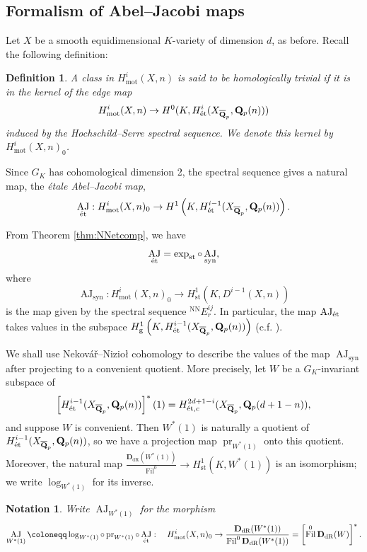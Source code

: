 \documentclass[cjm]{ipart}
\theoremstyle{plain}
\newtheorem{definition}[theorem]{Definition}
\newtheorem{notation}[theorem]{Notation}
\theoremstyle{remark}
\DeclareMathOperator{\AJ}{AJ}
\DeclareMathOperator{\Fil}{Fil}
\DeclareMathOperator{\mot}{mot}
\DeclareMathOperator{\pr}{pr}
\DeclareMathOperator{\st}{st}
\DeclareMathOperator{\syn}{syn}
\newcommand{\DdR}{\mathbf{D}_{\mathrm{dR}}}
\newcommand{\Nek}{Nekov\'a\v{r}\xspace}
\newcommand{\Niz}{Nizio\l\xspace}
\newcommand{\QQbar}{\overline{\QQ}}
\newcommand{\QQ}{\mathbf{Q}}
\newcommand{\Qp}{\QQ_p}
\newcommand{\et}{\text{\textup{\'et}}}
\numberwithin{equation}{subsection}
\begin{document}

 \subsection{Formalism of Abel--Jacobi maps}

  Let $X$ be a smooth equidimensional $K$-variety of dimension $d$, as before. Recall the following definition:

  \begin{definition}
   A class in $H^i_{\mot}(X, n)$ is said to be \emph{homologically trivial} if it is in the kernel of the edge map
   \[ H^i_{\mot}(X, n) \to H^0(K, H^i_{\et}(X_{\QQbar_p}, \Qp(n))) \]
   induced by the Hochschild--Serre spectral sequence. We denote this kernel by $H^i_{\mot}(X, n)_0$.
  \end{definition}

  Since $G_K$ has cohomological dimension 2, the spectral sequence gives a natural map, the \emph{\'etale Abel--Jacobi map},
  \[
   \AJ_{\et}: H^i_{\mot}(X, n)_0 \to H^1\left(K, H^{i-1}_{\et}(X_{\QQbar_p}, \Qp(n))\right) .
  \]

  \begin{note}
   From Theorem \ref{thm:NNetcomp}, we have
   \[
    \AJ_{\et} = \exp_{\st} \circ \AJ_{\syn},
   \]
   where
   \[ \AJ_{\syn}: H^i_{\mot}(X, n)_0 \to H^1_{\st}\left(K, D^{i-1}(X, n)\right)\]
   is the map given by the spectral sequence ${}^{\mathrm{NN}}E_r^{ij}$. In particular, the map $\AJ_{\et}$ takes values in the subspace $H^1_{\mathrm{g}}\left(K, H^{i-1}_{\et}(X_{\QQbar_p}, \Qp(n))\right)$ (c.f.  \cite[Theorem B]{nekovarniziol16}).
  \end{note}

  We shall use \Nek--\Niz cohomology to describe the values of the map $\AJ_{\syn}$ after projecting to a convenient quotient. More precisely, let $W$ be a $G_K$-invariant subspace of 
  \[\left[H^{i-1}_{\et}(X_{\QQbar_p}, \Qp(n))\right]^*(1) = H^{2d+1-i}_{\et, c}(X_{\QQbar_p}, \Qp(d+1-n)),\]
  and suppose $W$ is convenient. Then $W^*(1)$ is naturally a quotient of $H^{i-1}_{\et}(X_{\QQbar_p}, \Qp(n))$, so we have a projection map $\pr_{W^*(1)}$ onto this quotient. Moreover, the natural map $\frac{\DdR(W^*(1))}{\Fil^0} \to H^1_{\st}(K, W^*(1))$ is an isomorphism; we write $\log_{W^*(1)}$ for its inverse.


  \begin{notation}
   Write $\AJ_{W^*(1)}$ for the morphism
   \[
    \AJ_{W^*(1)} \coloneqq \log_{W^*(1)} \circ \operatorname{pr}_{W^*(1)} \circ \AJ_{\et}:\quad H^i_{\mot}(X, n)_0 \to \frac{\DdR({W^*(1)})}{\Fil^0 \DdR({W^*(1)})} = \left[ \Fil^0 \DdR(W)\right]^*.
   \]
  \end{notation}
\end{document}
